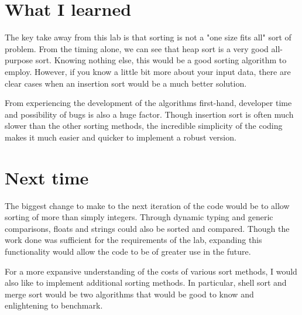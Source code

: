 \documentclass[a4paper,12pt]{article}
\begin{document}

\section{What I learned}
The key take away from this lab is that sorting is not a "one size fits all" sort of problem.  From the timing alone, we can see that heap sort is a very good all-purpose sort.  Knowing nothing else, this would be a good sorting algorithm to employ.  However, if you know a little bit more about your input data, there are clear cases when an insertion sort would be a much better solution.  

From experiencing the development of the algorithms first-hand, developer time and possibility of bugs is also a huge factor.  Though insertion sort is often much slower than the other sorting methods, the incredible simplicity of the coding makes it much easier and quicker to implement a robust version.


\section{Next time}
The biggest change to make to the next iteration of the code would be to allow sorting of more than simply integers.  Through dynamic typing
and generic comparisons, floats and strings could also be sorted and compared.  Though the work done was sufficient for the requirements of the lab, expanding this functionality would allow the code to be of greater use in the future.  

For a more expansive understanding of the costs of various sort methods, I would also like to implement additional sorting methods.  In particular, shell sort and merge sort would be two algorithms that would be good to know and enlightening to benchmark.


\end{document}

